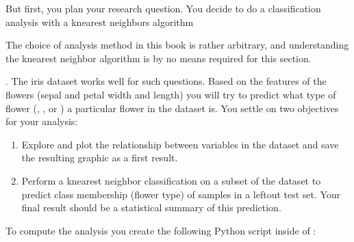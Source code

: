 \sphinxAtStartPar
But first, you plan your research question. You decide to do a
classification analysis with a k\sphinxhyphen{}nearest neighbors algorithm%
\begin{footnote}\sphinxAtStartFootnote
The choice of analysis method
in this book is rather arbitrary, and understanding the k\sphinxhyphen{}nearest
neighbor algorithm is by no means required for this section.
%
\end{footnote}. The iris
dataset works well for such questions. Based on the features of the flowers
(sepal and petal width and length) you will try to predict what type of
flower (, , or ) a particular flower in the
dataset is. You settle on two objectives for your analysis:
\begin{enumerate}
%
\item {} 
\sphinxAtStartPar
Explore and plot the relationship between variables in the dataset and save
the resulting graphic as a first result.

\item {} 
\sphinxAtStartPar
Perform a k\sphinxhyphen{}nearest neighbor classification on a subset of the dataset to
predict class membership (flower type) of samples in a left\sphinxhyphen{}out test set.
Your final result should be a statistical summary of this prediction.

\end{enumerate}

\sphinxAtStartPar
To compute the analysis you create the following Python script inside of :

